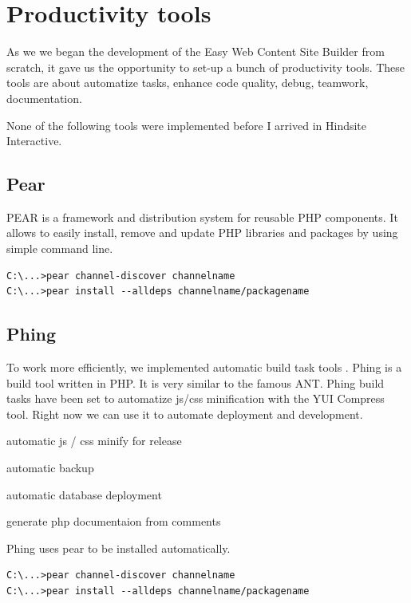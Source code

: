 \chapter{Productivity tools}
As we we began the development of the Easy Web Content Site Builder from scratch, it gave us the opportunity to set-up a bunch of productivity tools. These tools are about automatize tasks, enhance code quality, debug, teamwork, documentation.

None of the following tools were implemented before I arrived in Hindsite Interactive. 
\section{Pear}

PEAR is a framework and distribution system for reusable PHP components. It allows to easily install, remove and update PHP libraries and packages by using simple command line.

\lstset{language=bash}
\begin{lstlisting}[label=pear-install,caption=Installation of pear packages]
C:\...>pear channel-discover channelname
C:\...>pear install --alldeps channelname/packagename
\end{lstlisting}

\section{Phing}

To work more efficiently, we implemented automatic build task tools . Phing is a build tool written in PHP. It is very similar to the famous ANT. Phing build tasks have been set to automatize js/css minification with the YUI Compress tool.
Right now we can use it to automate deployment and development.
\begin{itemize*}
\item automatic js / css minify for release
\item automatic backup
\item automatic database deployment
\item generate php documentaion from comments
\end{itemize*}

Phing uses pear to be installed automatically.

\lstset{language=bash}
\begin{lstlisting}[label=phing-install,caption=Installation of Phing]
C:\...>pear channel-discover channelname
C:\...>pear install --alldeps channelname/packagename
\end{lstlisting}

